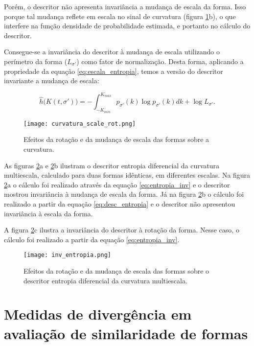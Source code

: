 Porém, o descritor não apresenta invariância a mudança de escala da forma. Isso porque tal mudança reflete em escala no sinal de curvatura (figura \ref{fig:curv_scale_rot}b), o que interfere na função densidade de probabilidade estimada, e portanto no cálculo do descritor.

Consegue-se a invariância do descritor à mudança de escala utilizando o perímetro da forma ($L_{\sigma'}$) como fator de normalização. Desta forma, aplicando a  propriedade da equação \ref{eq:escala_entropia}, temos a versão do descritor invariante a mudança de escala:

\begin{equation}\label{eq:entropia_inv}
\hat{h}\big(K(t,\sigma')\big) = -\int_{-K_{min}}^{K_{max}} p_{\sigma'}(k)\log{p_{\sigma'}(k)}dk+\log{L_{\sigma'}}\text{.}
\end{equation}

\begin{figure}[]
\caption{\label{fig:curv_scale_rot}Efeitos da rotação e da mudança de escala das formas sobre a curvatura.}
\texttt{[image: curvatura\_scale\_rot.png]}
\end{figure}

As figuras \ref{fig:entropia_inv}a e \ref{fig:entropia_inv}b ilustram o descritor entropia diferencial da curvatura multiescala, calculado para duas formas idênticas, em diferentes escalas. Na figura \ref{fig:entropia_inv}a o cálculo foi realizado através da equação \ref{eq:entropia_inv} e o descritor mostrou invariância à mudança de escala da forma. Já na figura \ref{fig:entropia_inv}b o cálculo foi realizado a partir da equação \ref{eq:desc_entropia} e o descritor não apresentou invariância à escala da forma.

A figura \ref{fig:entropia_inv}c ilustra a invariância do descritor à rotação da forma. Nesse caso, o cálculo foi realizado a partir da equação \ref{eq:entropia_inv}.

\begin{figure}[]
\caption{\label{fig:entropia_inv}Efeitos da rotação e da mudança de escala das formas sobre o descritor entropia diferencial da curvatura multiescala.}
\texttt{[image: inv\_entropia.png]}
\end{figure}

\section{Medidas de divergência em avaliação de similaridade de formas}

